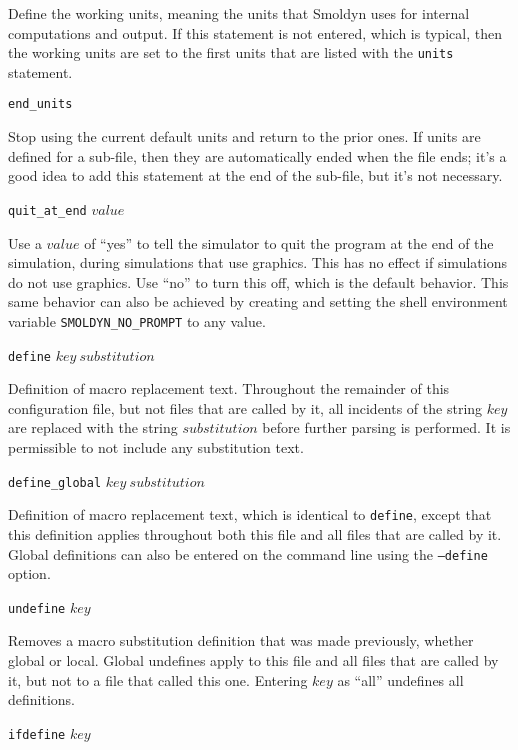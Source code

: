 \documentclass {scrbook}
\newcommand {\ttt} {\texttt}
\begin{document}
\begin{description}
Define the working units, meaning the units that Smoldyn uses for internal computations and output. If this statement is not entered, which is typical, then the working units are set to the first units that are listed with the \ttt{units} statement.

\item{\ttt{end\_units}}

Stop using the current default units and return to the prior ones. If units are defined for a sub-file, then they are automatically ended when the file ends; it's a good idea to add this statement at the end of the sub-file, but it's not necessary.

\item{\ttt{quit\_at\_end} $value$}

Use a $value$ of ``yes'' to tell the simulator to quit the program at the end of the simulation, during simulations that use graphics. This has no effect if simulations do not use graphics. Use ``no'' to turn this off, which is the default behavior. This same behavior can also be achieved by creating and setting the shell environment variable \ttt{SMOLDYN\_NO\_PROMPT} to any value.

\item{\ttt{define} $key\ substitution$}

Definition of macro replacement text. Throughout the remainder of this configuration file, but not files that are called by it, all incidents of the string $key$ are replaced with the string $substitution$ before further parsing is performed. It is permissible to not include any substitution text.

\item{\ttt{define\_global} $key\ substitution$}

Definition of macro replacement text, which is identical to \ttt{define}, except that this definition applies throughout both this file and all files that are called by it. Global definitions can also be entered on the command line using the \ttt{--define} option.

\item{\ttt{undefine} $key$}

Removes a macro substitution definition that was made previously, whether global or local. Global undefines apply to this file and all files that are called by it, but not to a file that called this one. Entering $key$ as ``all'' undefines all definitions.

\item{\ttt{ifdefine} $key$}


\end{description}
\end{document}
